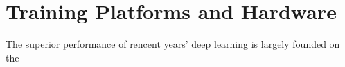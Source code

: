 \section{Training Platforms and Hardware}
The superior performance of rencent years' deep learning is largely founded on the 